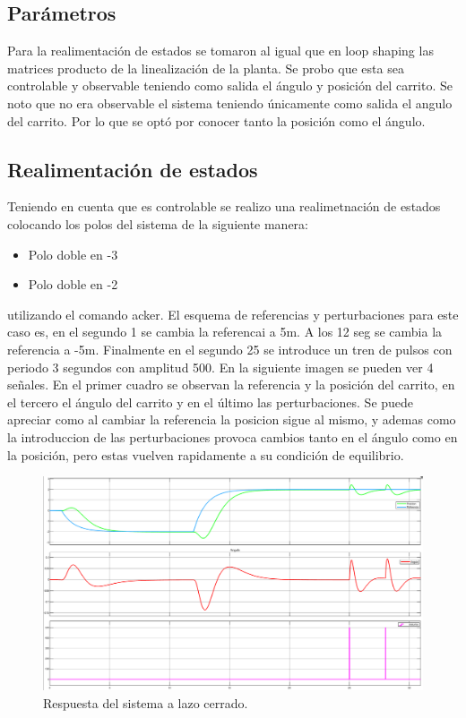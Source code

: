 \subsection{Par\'ametros}
 Para la realimentación de estados se tomaron al igual que en loop shaping las matrices producto de la linealizaci\'on de la planta.
 Se probo que esta sea controlable y observable teniendo como salida el \'angulo y posici\'on del carrito.
 Se noto que no era observable el sistema teniendo únicamente como salida el angulo del carrito. Por lo que se opt\'o por conocer tanto la posici\'on como el \'angulo.
 
 \subsection{Realimentaci\'on de estados}
 Teniendo en cuenta que es controlable se realizo una realimetnaci\'on de estados colocando los polos del sistema de la siguiente manera:
 \begin{itemize}
 \item Polo doble en -3
  \item Polo doble en -2
\end{itemize}
utilizando el comando acker.
El esquema de referencias y perturbaciones para este caso es, en el segundo 1 se cambia la referencai a 5m. A los 12 seg se cambia la referencia a -5m. Finalmente en el segundo 25 se introduce un tren de pulsos con periodo 3 segundos con amplitud 500.
En la siguiente imagen se pueden ver 4 señales. En el primer cuadro se observan la referencia y la posición del carrito, en el tercero el ángulo del carrito y en el último las perturbaciones.
Se puede apreciar como al cambiar la referencia la posicion sigue al mismo, y ademas como la introduccion de las perturbaciones provoca cambios tanto en el ángulo como en la posición, pero estas vuelven rapidamente a su condición de equilibrio. 
\begin{figure}[H]
	\centering
	\includegraphics[width=1\linewidth]{Imagenes/Control_por_realimentacion/general.png}
	\caption{Respuesta del sistema a lazo cerrado.}
	\label{realmentacion}
\end{figure}

